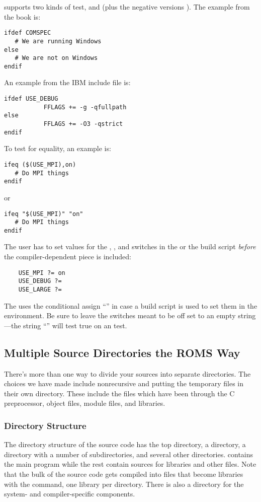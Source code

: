  supports two kinds of  test,  and
 (plus the
negative versions ). The example from the book is:
\begin{verbatim}
ifdef COMSPEC
   # We are running Windows
else
   # We are not on Windows
endif
\end{verbatim}
An example from the IBM include file is:
\begin{verbatim}
ifdef USE_DEBUG
           FFLAGS += -g -qfullpath
else
           FFLAGS += -O3 -qstrict
endif
\end{verbatim}
To test for equality, an example is:
\begin{verbatim}
ifeq ($(USE_MPI),on)
   # Do MPI things
endif
\end{verbatim}
or 
\begin{verbatim}
ifeq "$(USE_MPI)" "on"
   # Do MPI things
endif
\end{verbatim}
The user has to set values for the , ,
and  switches in the  or the build
script {\em before} the compiler-dependent piece is included:
\begin{verbatim}
    USE_MPI ?= on
    USE_DEBUG ?=
    USE_LARGE ?=
\end{verbatim}
The  uses the conditional assign ``''
in case a build script is used to set them in the environment.
Be sure to leave the switches meant to be off set to an empty string---the
string ``'' will test true on an  test.

\subsection{Multiple Source Directories the ROMS Way}

There's more than one way to divide your sources into separate
directories. The choices we have made include nonrecursive 
and putting the temporary files in their own 
directory. These include the  files which have been through
the C preprocessor, object files, module files, and libraries.

\subsubsection{Directory Structure}

The directory structure of the source code has the top directory,
a  directory, a  directory with a number of
subdirectories, and several other directories.  contains
the main program while the rest contain sources for libraries and
other files. Note that the bulk of the source code gets compiled into
files that become libraries with the  command, one library per
directory. There is also a  directory for the system-
and compiler-specific  components.

